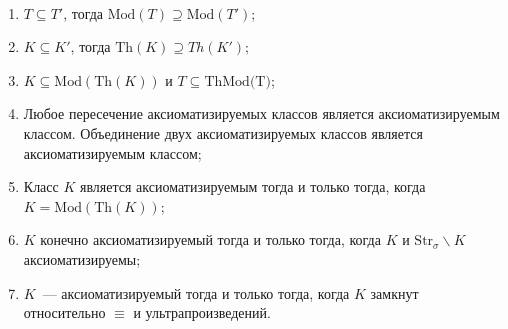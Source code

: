 \begin{prop} \ 

    \begin{enumerate}
        \item \label{aksiom1} $T \subseteq T'$, тогда $\text{Mod}(T) \supseteq \text{Mod}(T')$; 
        \item \label{aksiom2} $K \subseteq K'$, тогда $\text{Th}(K) \supseteq Th(K')$; 
        \item \label{aksiom3} $K \subseteq \text{Mod}(\text{Th}(K))$ и  $T \subseteq \text{Th}{\text{Mod(T)}}$; 
        \item \label{aksiom4} Любое пересечение аксиоматизируемых классов является аксиоматизируемым классом. Объединение двух аксиоматизируемых классов является аксиоматизируемым классом; 
        \item \label{aksiom5} Класс $K$ является аксиоматизируемым тогда и только тогда, когда $K = \text{Mod}(\text{Th}(K))$; 
        \item \label{aksiom6} $K$ конечно аксиоматизируемый тогда и только тогда, когда $K$ и $\text{Str}_\sigma \backslash K$ аксиоматизируемы; 
        \item \label{aksiom7} $K$~— аксиоматизируемый тогда и только тогда, когда $K$ замкнут относительно $\equiv$ и ультрапроизведений.
    \end{enumerate}
\end{prop}

